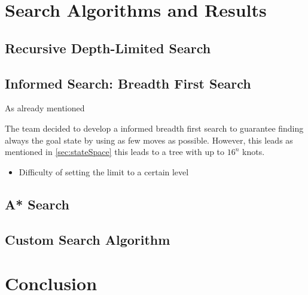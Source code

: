 \documentclass[a4paper,10pt]{article}
\begin{document}
\section{Search Algorithms and Results}


  \subsection{Recursive Depth-Limited Search}


  \subsection{Informed Search: Breadth First Search}
  As already mentioned
  
  The team decided to develop a informed breadth first search to guarantee finding always the goal state by using as few moves as possible. However, this leads as mentioned in \ref{sec:stateSpace} this leads to a tree with up to $16^n$ knots.  
  \begin{itemize}
    \item Difficulty of setting the limit to a certain level
  \end{itemize}


  \subsection{A* Search}


  \subsection{Custom Search Algorithm}


\section{Conclusion}
\end{document}
